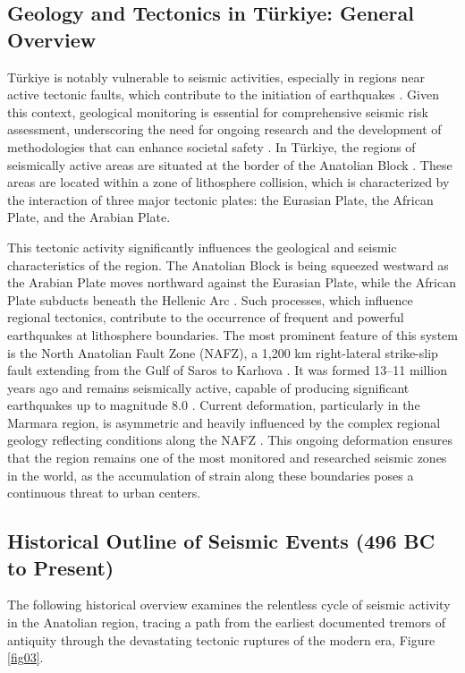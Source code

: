 \documentclass[data,article,submit,pdftex,moreauthors]{Definitions/mdpi}
\begin{document}
\subsection{Geology and Tectonics in Türkiye: General Overview}

Türkiye is notably vulnerable to seismic activities, especially in regions near active tectonic faults, which contribute to the initiation of earthquakes \cite{Basaran2014,Kandregula2024}. Given this context, geological monitoring is essential for comprehensive seismic risk assessment, underscoring the need for ongoing research and the development of methodologies that can enhance societal safety \cite{Korkmaz2013}. In Türkiye, the regions of seismically active areas are situated at the border of the Anatolian Block \cite{Jolivet2023}. These areas are located within a zone of lithosphere collision, which is characterized by the interaction of three major tectonic plates: the Eurasian Plate, the African Plate, and the Arabian Plate.

This tectonic activity significantly influences the geological and seismic characteristics of the region. The Anatolian Block is being squeezed westward as the Arabian Plate moves northward against the Eurasian Plate, while the African Plate subducts beneath the Hellenic Arc \cite{McKenzie1972, LePichon2010}. Such processes, which influence regional tectonics, contribute to the occurrence of frequent and powerful earthquakes at lithosphere boundaries. The most prominent feature of this system is the North Anatolian Fault Zone (NAFZ), a 1,200 km right-lateral strike-slip fault extending from the Gulf of Saros to Karlıova \cite{Barka1992, Sengor2005}. It was formed 13–11 million years ago and remains seismically active, capable of producing significant earthquakes up to magnitude 8.0 \cite{Stein1997}. Current deformation, particularly in the Marmara region, is asymmetric and heavily influenced by the complex regional geology reflecting conditions along the NAFZ \cite{Puccinelli2021}. This ongoing deformation ensures that the region remains one of the most monitored and researched seismic zones in the world, as the accumulation of strain along these boundaries poses a continuous threat to urban centers.

\subsection{Historical Outline of Seismic Events (496 BC to Present)}

The following historical overview examines the relentless cycle of seismic activity in the Anatolian region, tracing a path from the earliest documented tremors of antiquity through the devastating tectonic ruptures of the modern era, Figure \ref{fig03}. 
\end{document}
